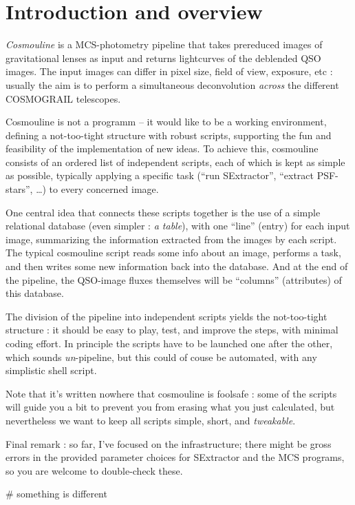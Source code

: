 
\section{Introduction and overview}

\emph{Cosmouline} is a MCS-photometry pipeline that takes prereduced images of gravitational lenses as input and returns lightcurves of the deblended QSO images. The input images can differ in pixel size, field of view, exposure, etc : usually the aim is to perform a simultaneous deconvolution \emph{across} the different COSMOGRAIL telescopes.

Cosmouline is not a programm -- it would like to be a working environment, defining a not-too-tight structure with robust scripts, supporting the fun and feasibility of the implementation of new ideas. To achieve this, cosmouline consists of an ordered list of independent scripts, each of which is kept as simple as possible, typically applying a specific task (``run SExtractor'', ``extract PSF-stars'', \ldots) to every concerned image.

One central idea that connects these scripts together is the use of a simple relational database (even simpler : \emph{a table}), with one ``line'' (entry) for each input image, summarizing the information extracted from the images by each script. The typical cosmouline script reads some info about an image, performs a task, and then writes some new information back into the database. And at the end of the pipeline, the QSO-image fluxes themselves will be ``columns'' (attributes) of  this database.


The division of the pipeline into independent scripts yields the not-too-tight structure : it should be easy to play, test, and improve the steps, with minimal coding effort. In principle the scripts have to be launched one after the other, which sounds \emph{un}-pipeline, but this could of couse be automated, with any simplistic shell script.

Note that it's written nowhere that cosmouline is foolsafe : some of the scripts will guide you a bit to prevent you from erasing what you just calculated, but nevertheless we want to keep all scripts simple, short, and \emph{tweakable}\texttrademark.

Final remark : so far, I've focused on the infrastructure; there might be gross errors in the provided parameter choices for SExtractor and the MCS programs, so you are welcome to double-check these.


# something is different



